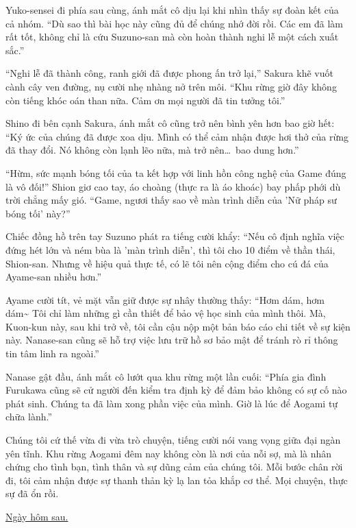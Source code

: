 \documentclass[../main.tex]{subfiles}
\begin{document}
Yuko-sensei đi phía sau cùng, ánh mắt cô dịu lại khi nhìn thấy sự đoàn kết của cả nhóm. ``Dù sao thì bài học này cũng đủ để chúng nhớ đời rồi. Các em đã làm rất tốt, không chỉ là cứu Suzuno-san mà còn hoàn thành nghi lễ một cách xuất sắc.''

``Nghi lễ đã thành công, ranh giới đã được phong ấn trở lại,'' Sakura khẽ vuốt cành cây ven đường, nụ cười nhẹ nhàng nở trên môi. ``Khu rừng giờ đây không còn tiếng khóc oán than nữa. Cảm ơn mọi người đã tin tưởng tôi.''

Shino đi bên cạnh Sakura, ánh mắt cô cũng trở nên bình yên hơn bao giờ hết: ``Ký ức của chúng đã được xoa dịu. Mình có thể cảm nhận được hơi thở của rừng đã thay đổi. Nó không còn lạnh lẽo nữa, mà trở nên\dots\ bao dung hơn.''

``Hừm, sức mạnh bóng tối của ta kết hợp với linh hồn công nghệ của Game đúng là vô đối!'' Shion giơ cao tay, áo choàng (thực ra là áo khoác) bay phấp phới dù trời chẳng mấy gió. ``Game, ngươi thấy sao về màn trình diễn của 'Nữ pháp sư bóng tối' này?''

Chiếc đồng hồ trên tay Suzuno phát ra tiếng cười khẩy: ``Nếu cô định nghĩa việc đứng hét lớn và ném bùa là 'màn trình diễn', thì tôi cho 10 điểm về thần thái, Shion-san. Nhưng về hiệu quả thực tế, có lẽ tôi nên cộng điểm cho cú đá của Ayame-san nhiều hơn.''

Ayame cười tít, vẻ mặt vẫn giữ được sự nhây thường thấy: ``Hơm dám, hơm dám\~{} Tôi chỉ làm những gì cần thiết để bảo vệ học sinh của mình thôi. Mà, Kuon-kun này, sau khi trở về, tôi cần cậu nộp một bản báo cáo chi tiết về sự kiện này. Nanase-san cũng sẽ hỗ trợ việc lưu trữ hồ sơ bảo mật để tránh rò rỉ thông tin tâm linh ra ngoài.''

Nanase gật đầu, ánh mắt cô lướt qua khu rừng một lần cuối: ``Phía gia đình Furukawa cũng sẽ cử người đến kiểm tra định kỳ để đảm bảo không có sự cố nào phát sinh. Chúng ta đã làm xong phần việc của mình. Giờ là lúc để Aogami tự chữa lành.''

Chúng tôi cứ thế vừa đi vừa trò chuyện, tiếng cười nói vang vọng giữa đại ngàn yên tĩnh. Khu rừng Aogami đêm nay không còn là nơi của nỗi sợ, mà là nhân chứng cho tình bạn, tình thân và sự dũng cảm của chúng tôi. Mỗi bước chân rời đi, tôi cảm nhận được sự thanh thản kỳ lạ lan tỏa khắp cơ thể. Mọi chuyện, thực sự đã ổn rồi.

\begin{center}
  \uline{Ngày hôm sau.}
\end{center}
\end{document}
